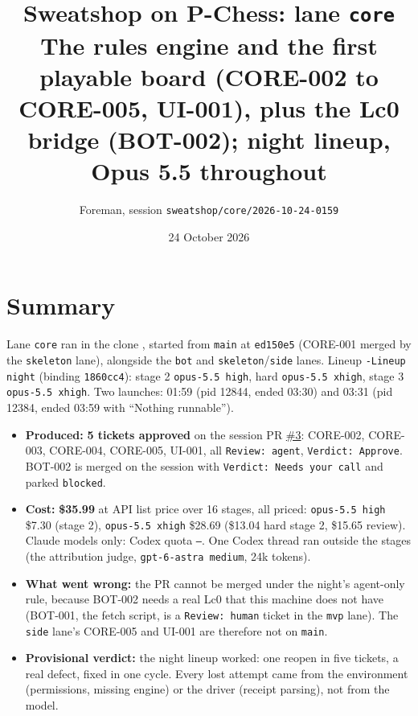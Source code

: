 \documentclass[11pt,a4paper]{article}
\title{Sweatshop on P-Chess: lane \texttt{core}\\\large The rules engine and the first playable board (CORE-002 to CORE-005, UI-001), plus the Lc0 bridge (BOT-002); night lineup, Opus 5.5 throughout}
\author{Foreman, session \texttt{sweatshop/core/2026-10-24-0159}}
\date{24 October 2026}
\begin{document}
\maketitle

\section*{Summary}

Lane \texttt{core} ran in the clone , started from
\texttt{main} at \texttt{ed150e5} (CORE-001 merged by the \texttt{skeleton} lane), alongside
the \texttt{bot} and \texttt{skeleton}/\texttt{side} lanes. Lineup \texttt{-Lineup night}
(binding \texttt{1860cc4}): stage 2 \texttt{opus-5.5 high}, hard \texttt{opus-5.5 xhigh},
stage 3 \texttt{opus-5.5 xhigh}. Two launches: 01:59 (pid 12844, ended 03:30) and 03:31 (pid
12384, ended 03:59 with ``Nothing runnable'').

\begin{itemize}
  \item \textbf{Produced:} \textbf{5 tickets approved} on the session PR
        \href{https://github.com/Laginho/P-Chess/pull/3}{\#3}: CORE-002, CORE-003, CORE-004,
        CORE-005, UI-001, all \texttt{Review: agent}, \texttt{Verdict: Approve}. BOT-002 is
        merged on the session with \texttt{Verdict: Needs your call} and parked
        \texttt{blocked}.
  \item \textbf{Cost:} \textbf{\$35.99} at API list price over 16 stages, all priced:
        \texttt{opus-5.5 high} \$7.30 (stage 2), \texttt{opus-5.5 xhigh} \$28.69 (\$13.04 hard
        stage 2, \$15.65 review). Claude models only: Codex quota \texttt{--}. One Codex
        thread ran outside the stages (the attribution judge, \texttt{gpt-6-astra medium},
        24k tokens).
  \item \textbf{What went wrong:} the PR cannot be merged under the night's agent-only rule,
        because BOT-002 needs a real Lc0 that this machine does not have (BOT-001, the fetch
        script, is a \texttt{Review: human} ticket in the \texttt{mvp} lane). The
        \texttt{side} lane's CORE-005 and UI-001 are therefore not on \texttt{main}.
  \item \textbf{Provisional verdict:} the night lineup worked: one reopen in five tickets, a
        real defect, fixed in one cycle. Every lost attempt came from the environment
        (permissions, missing engine) or the driver (receipt parsing), not from the model.
\end{itemize}
\end{document}
